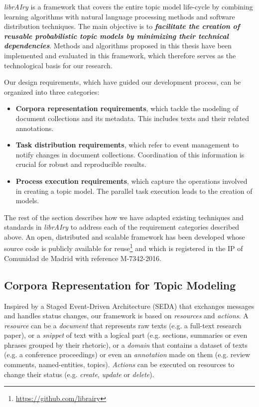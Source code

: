 \textit{librAIry} is a framework that covers the entire topic model life-cycle by combining learning algorithms with natural language processing methods and software distribution techniques. The main objective is to \textbf{\textit{facilitate the creation of reusable probabilistic topic models by minimizing their technical dependencies}}. Methods and algorithms proposed in this thesis have been implemented and evaluated in this framework, which therefore serves as the technological basis for our research.

Our design requirements, which have guided our development process, can be organized into three categories:
\begin{itemize}
\item \textbf{Corpora representation requirements}, which tackle the modeling of document collections and its metadata. This includes texts and their related annotations.
\item \textbf{Task distribution requirements}, which refer to event management to notify changes in document collections. Coordination of this information is crucial for robust and reproducible results.  
\item \textbf{Process execution requirements}, which capture the operations involved in creating a topic model. The parallel task execution leads to the creation of models.
\end{itemize}

The rest of the section describes how we have adapted existing techniques and standards in \textit{librAIry} to address each of the requirement categories described above. An open, distributed and scalable framework has been developed whose source code is publicly available for reuse\footnote{\url{https://github.com/librairy}} and which is registered in the IP of Comunidad de Madrid with reference M-7342-2016.

\subsection{Corpora Representation for Topic Modeling}
\label{sec:representing-corpora}

Inspired by a Staged Event-Driven Architecture (SEDA) that exchanges messages and handles status changes, our framework is based on \textit{resources} and \textit{actions}. A \textit{resource} can be a \textit{document} that represents raw texts (e.g. a full-text research paper), or a \textit{snippet} of text with a logical part  (e.g. sections, summaries or even phrases grouped by their rhetoric), or a \textit{domain} that contains a dataset of texts (e.g. a conference proceedings) or even an \textit{annotation} made on them (e.g. review comments, named-entities, topics). \textit{Actions} can be executed on resources to change their status (e.g. \textit{create}, \textit{update} or \textit{delete}).

